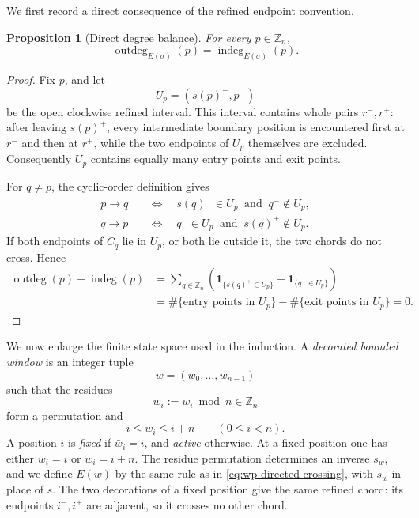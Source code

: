 \documentclass[11pt]{article}
\newtheorem{proposition}[theorem]{Proposition}
\theoremstyle{definition}
\begin{document}
We first record a direct consequence of the refined endpoint convention.

\begin{proposition}[Direct degree balance]
\label{prop:wp-direct-balance}
For every \(p\in\mathbb Z_n\),
\[
   \operatorname{outdeg}_{E(\sigma)}(p)
   =
   \operatorname{indeg}_{E(\sigma)}(p).
\]
\end{proposition}

\begin{proof}
Fix \(p\), and let
\[
   U_p=(s(p)^+,p^-)
\]
be the open clockwise refined interval. This interval contains whole pairs
\(r^-,r^+\): after leaving \(s(p)^+\), every intermediate boundary position
is encountered first at \(r^-\) and then at \(r^+\), while the two endpoints
of \(U_p\) themselves are excluded. Consequently \(U_p\) contains equally
many entry points and exit points.

For \(q\ne p\), the cyclic-order definition gives
\[
\begin{aligned}
   p\to q
   &\quad\Longleftrightarrow\quad
   s(q)^+\in U_p\ \text{ and }\ q^-\notin U_p,\\
   q\to p
   &\quad\Longleftrightarrow\quad
   q^-\in U_p\ \text{ and }\ s(q)^+\notin U_p.
\end{aligned}
\]
If both endpoints of \(C_q\) lie in \(U_p\), or both lie outside it, the two
chords do not cross. Hence
\[
\begin{aligned}
  \operatorname{outdeg}(p)-\operatorname{indeg}(p)
   &=
   \sum_{q\in\mathbb Z_n}
   \left(
      \mathbf 1_{\{s(q)^+\in U_p\}}
      -
      \mathbf 1_{\{q^-\in U_p\}}
   \right)\\
   &=
   \#\{\text{entry points in }U_p\}
   -
   \#\{\text{exit points in }U_p\}
   =0.
\end{aligned}
\]
\end{proof}

We now enlarge the finite state space used in the induction. A
\emph{decorated bounded window} is an integer tuple
\[
   w=(w_0,\ldots,w_{n-1})
\]
such that the residues
\[
   \bar w_i:=w_i\bmod n\in\mathbb Z_n
\]
form a permutation and
\begin{equation}
   i\le w_i\le i+n
   \qquad(0\le i<n).
   \label{eq:wp-window-bounds}
\end{equation}
A position \(i\) is \emph{fixed} if \(\bar w_i=i\), and \emph{active}
otherwise. At a fixed position one has either \(w_i=i\) or \(w_i=i+n\).
The residue permutation determines an inverse \(s_w\), and we define \(E(w)\)
by the same rule as in \eqref{eq:wp-directed-crossing}, with \(s_w\) in place
of \(s\). The two decorations of a fixed position give the same refined
chord: its endpoints \(i^-,i^+\) are adjacent, so it crosses no other chord.
\end{document}
